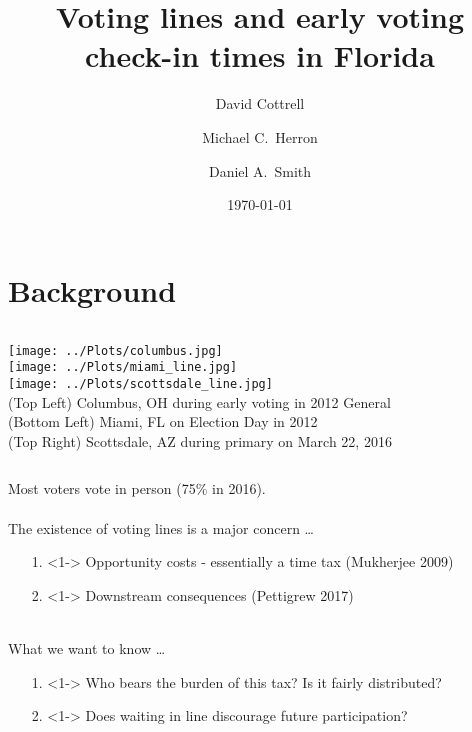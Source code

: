 \documentclass{beamer}
\title{\small Voting lines and early voting check-in times in Florida}
\author{David Cottrell\inst{1} \and Michael C.\ Herron\inst{1}
  \newline \and  Daniel A.\ Smith\inst{2}}
\institute{\inst{1} Dartmouth College \and %
  \inst{2} University of Florida}
\date{\today}
\begin{document}
	\frame{\titlepage}
	\section{Background}
	
	\begin{frame}
		\begin{columns}[t]
			\centering
			\texttt{[image: ../Plots/columbus.jpg]} \\		
			\texttt{[image: ../Plots/miami\_line.jpg]}\\
			\texttt{[image: ../Plots/scottsdale\_line.jpg]}\\
			\footnotesize{
				(Top Left) Columbus, OH during early voting in 2012 General \\ \vspace{3mm}
				(Bottom Left) Miami, FL on Election Day in 2012 \\ \vspace{3mm}
				(Top Right)  Scottsdale, AZ during primary on March 22, 2016
				}
		\end{columns}
	\end{frame}
	
	\begin{frame}
		Most voters vote in person (75\% in 2016).  \\~\\
	
		The existence of voting lines is a major concern \ldots
			\begin{itemize}
				\item[1.]<1-> Opportunity costs - essentially a time tax {\tiny (Mukherjee 2009)}
				\item[2.]<1-> Downstream consequences  {\tiny (Pettigrew 2017)}\\~\\
			\end{itemize} 
		What we want to know \dots
			\begin{itemize}
				\item[1.]<1-> Who bears the burden of this tax? Is it fairly distributed?
				\item[2.]<1-> Does waiting in line discourage future participation?
			\end{itemize}
	\end{frame}

		
			
\end{document}
